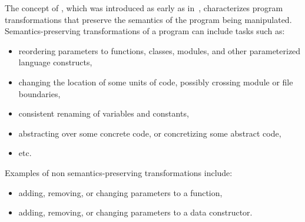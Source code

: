 The concept of , which was introduced as early as
in~\citet{wirfs1990surveying}, characterizes program transformations that
preserve the semantics of the program being manipulated.  Semantics-preserving
transformations of a program can include tasks such as:

\begin{itemize}

  \item reordering parameters to functions, classes, modules, and other
parameterized language constructs,

  \item changing the location of some units of code, possibly crossing module or
file boundaries,

  \item consistent renaming of variables and constants,

  \item abstracting over some concrete code, or concretizing some abstract code,

  \item etc.

\end{itemize}

\noindent%
%
Examples of non semantics-preserving transformations include:

\begin{itemize}

  \item adding, removing, or changing parameters to a function,

  \item adding, removing, or changing parameters to a data constructor.

\end{itemize}

